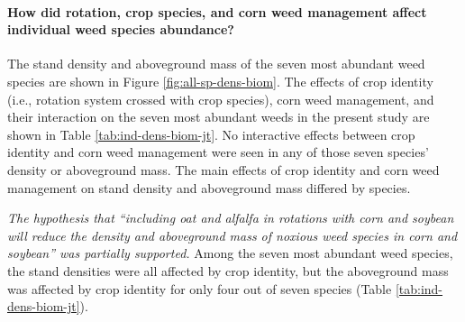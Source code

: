 \documentclass[
]{article}
\author{}
\date{\vspace{-2.5em}}
\begin{document}
\hypertarget{how-did-rotation-crop-species-and-corn-weed-management-affect-individual-weed-species-abundance}{%
\paragraph*{How did rotation, crop species, and corn weed management affect individual weed species abundance?}\label{how-did-rotation-crop-species-and-corn-weed-management-affect-individual-weed-species-abundance}}

The stand density and aboveground mass of the seven most abundant weed species are shown in Figure \ref{fig:all-sp-dens-biom}. The effects of crop identity (i.e., rotation system crossed with crop species), corn weed management, and their interaction on the seven most abundant weeds in the present study are shown in Table \ref{tab:ind-dens-biom-jt}.
No interactive effects between crop identity and corn weed management were seen in any of those seven species' density or aboveground mass. The main effects of crop identity and corn weed management on stand density and aboveground mass differed by species.

\emph{The hypothesis that ``including oat and alfalfa in rotations with corn and soybean will reduce the density and aboveground mass of noxious weed species in corn and soybean'' was partially supported.} Among the seven most abundant weed species, the stand densities were all affected by crop identity, but the aboveground mass was affected by crop identity for only four out of seven species (Table \ref{tab:ind-dens-biom-jt}).
\end{document}
